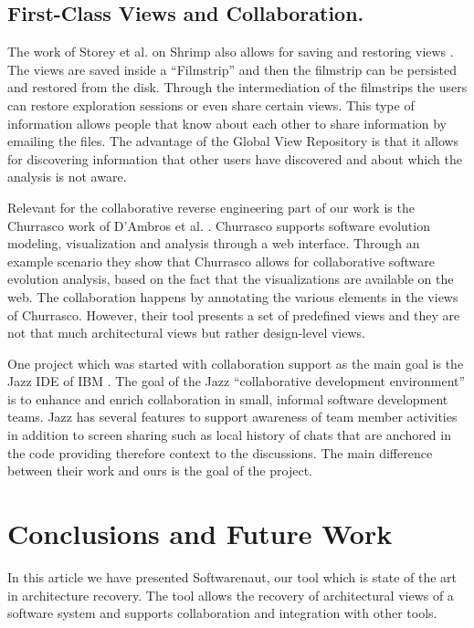 \documentclass[preprint,12pt]{elsarticle}
\begin{document}
\subsection {First-Class Views and Collaboration.} The work of Storey et al. on Shrimp also allows for saving and restoring views \cite{rayside-flow}. The views are saved inside a “Filmstrip” and then the filmstrip can be persisted and restored from the disk. Through the intermediation of the filmstrips the users can restore exploration sessions or even share certain views. This type of information allows people that know about each other to share information by emailing the files. The advantage of the Global View Repository is that it allows for discovering information that other users have discovered and about which the analysis is not aware. 


Relevant for the collaborative reverse engineering part of our work is the Churrasco work of D’Ambros et al. \cite{dambros-churrasco}. Churrasco supports software evolution modeling, visualization and analysis through a web interface. 
Through an example scenario they show that Churrasco allows for collaborative software evolution analysis, based on the fact that the visualizations are available on the web. The collaboration happens by annotating the various elements in the views of Churrasco. However, their tool presents a set of predefined views and they are not that much architectural views but rather design-level views. 

One project which was started with collaboration support as the main goal is the Jazz IDE of IBM \cite{hupfer-jazz}. The goal of the Jazz ``collaborative development environment'' is to enhance and enrich collaboration in small, informal software development teams. Jazz has several features to support awareness of team member activities in addition to screen sharing such as local history of chats that are anchored in the code providing therefore context to the discussions. The main difference between their work and ours is the goal of the project.





\newpage
\section {Conclusions and Future Work}
\label {sec:conc}

In this article we have presented Softwarenaut, our tool which is state of the art in architecture recovery. The tool allows the recovery of architectural views of a software system and supports collaboration and integration with other tools. 
\end{document}
